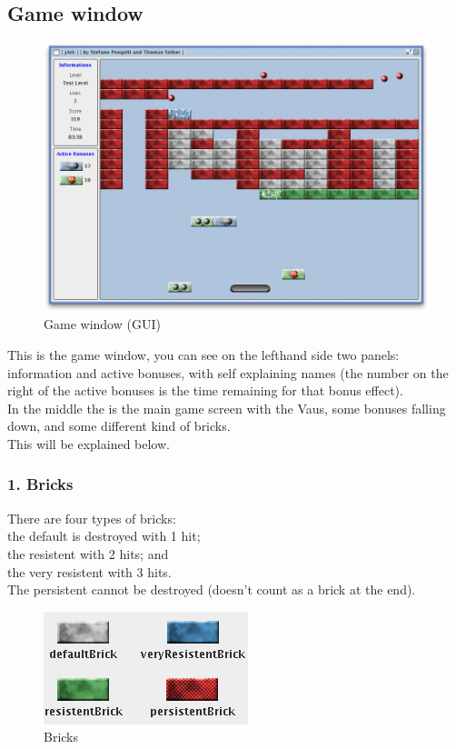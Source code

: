 \documentclass[12pt]{article}
\begin{document}
\newpage
\subsection{Game window}
 
\begin{figure}[htbp]
  \centering
    \includegraphics[scale=0.4]{gamewindow.png}
  \caption{Game window (GUI)}
  \label{guigame}
\end{figure}
This is the game window, you can see on the lefthand side two panels: information and active bonuses, with self explaining names (the number on the right of the active bonuses is the time remaining for that bonus effect).\\
In the middle the is the main game screen with the Vaus, some bonuses falling down, and some different kind of bricks.\\
This will be explained below.\\
\newpage
\subsubsection*{1. Bricks}
There are four types of bricks: \\
the default is destroyed with 1 hit;\\
the resistent with 2 hits; and \\
the very resistent with 3 hits.\\
The persistent cannot be destroyed (doesn't count as a brick at the end).\\
\begin{figure}[htbp]
  \centering
    \includegraphics[scale=0.7]{bricks.png}
  \caption{Bricks}
  \label{buddies}
\end{figure}
\end{document}
